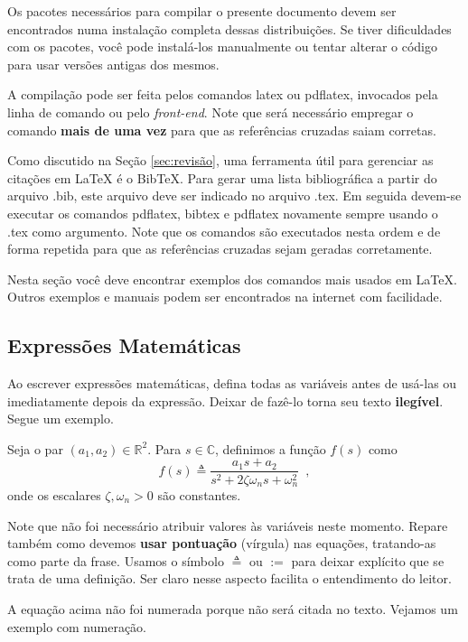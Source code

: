 Os pacotes necessários para compilar o presente documento devem ser encontrados numa instalação completa dessas distribuições. Se tiver dificuldades com os pacotes, você pode instalá-los manualmente ou tentar alterar o código para usar versões antigas dos mesmos.

A compilação pode ser feita pelos comandos \textsf{latex} ou \textsf{pdflatex}, invocados pela linha de comando ou pelo \emph{front-end}. Note que será necessário empregar o comando \textbf{mais de uma vez} para que as referências cruzadas saiam corretas.

Como discutido na Seção \ref{sec:revisão}, uma ferramenta útil para gerenciar as citações em {\LaTeX} é o Bib\TeX. Para gerar uma lista bibliográfica a partir do arquivo .bib, este arquivo deve ser indicado no arquivo .tex. Em seguida devem-se executar os comandos \textsf{pdflatex}, \textsf{bibtex} e \textsf{pdflatex} novamente sempre usando o .tex como argumento. Note que os comandos são executados nesta ordem e de forma repetida para que as referências cruzadas sejam geradas corretamente.

Nesta seção você deve encontrar exemplos dos comandos mais usados em \LaTeX. Outros exemplos e manuais podem ser encontrados na internet com facilidade.

\subsection{Expressões Matemáticas}

Ao escrever expressões matemáticas, defina todas as variáveis antes de usá-las ou imediatamente depois da expressão. Deixar de fazê-lo torna seu texto \textbf{ilegível}. Segue um exemplo.

Seja o par $(a_1,a_2)\in \mathbb{R}^2$. Para $s\in\mathbb{C}$, definimos a função $f(s)$ como
\[%
f(s)\triangleq \frac{a_1 s+a_2}{s^2+2\zeta\omega_n s+\omega_n^2}
\enspace,
\]
onde os escalares $\zeta,\omega_n>0$ são constantes.

Note que não foi necessário atribuir valores às variáveis neste momento. Repare também como devemos \textbf{usar pontuação} (vírgula) nas equações, tratando-as como parte da frase. Usamos o símbolo $\triangleq$ ou $:=$ para deixar explícito que se trata de uma definição. Ser claro nesse aspecto facilita o entendimento do leitor.

A equação acima não foi numerada porque não será citada no texto. Vejamos um exemplo com numeração.

